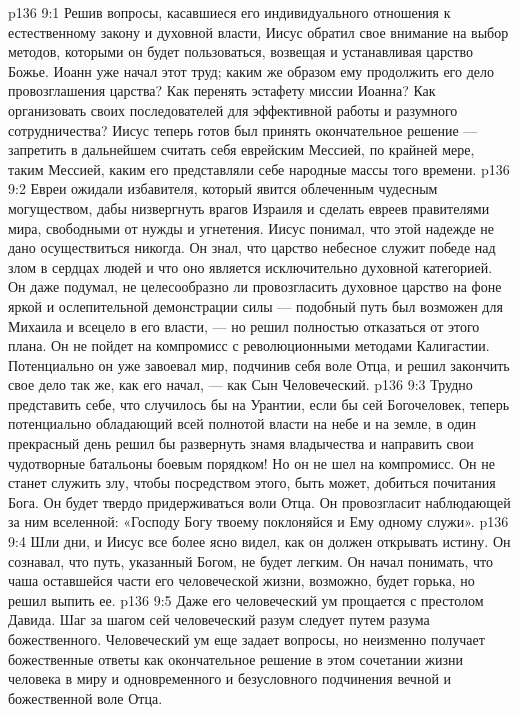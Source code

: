 \vs p136 9:1 Решив вопросы, касавшиеся его индивидуального отношения к естественному закону и духовной власти, Иисус обратил свое внимание на выбор методов, которыми он будет пользоваться, возвещая и устанавливая царство Божье. Иоанн уже начал этот труд; каким же образом ему продолжить его дело провозглашения царства? Как перенять эстафету миссии Иоанна? Как организовать своих последователей для эффективной работы и разумного сотрудничества? Иисус теперь готов был принять окончательное решение --- запретить в дальнейшем считать себя еврейским Мессией, по крайней мере, таким Мессией, каким его представляли себе народные массы того времени.
\vs p136 9:2 Евреи ожидали избавителя, который явится облеченным чудесным могуществом, дабы низвергнуть врагов Израиля и сделать евреев правителями мира, свободными от нужды и угнетения. Иисус понимал, что этой надежде не дано осуществиться никогда. Он знал, что царство небесное служит победе над злом в сердцах людей и что оно является исключительно духовной категорией. Он даже подумал, не целесообразно ли провозгласить духовное царство на фоне яркой и ослепительной демонстрации силы --- подобный путь был возможен для Михаила и всецело в его власти, --- но решил полностью отказаться от этого плана. Он не пойдет на компромисс с революционными методами Калигастии. Потенциально он уже завоевал мир, подчинив себя воле Отца, и решил закончить свое дело так же, как его начал, --- как Сын Человеческий.
\vs p136 9:3 Трудно представить себе, что случилось бы на Урантии, если бы сей Богочеловек, теперь потенциально обладающий всей полнотой власти на небе и на земле, в один прекрасный день решил бы развернуть знамя владычества и направить свои чудотворные батальоны боевым порядком! Но он не шел на компромисс. Он не станет служить злу, чтобы посредством этого, быть может, добиться почитания Бога. Он будет твердо придерживаться воли Отца. Он провозгласит наблюдающей за ним вселенной: «Господу Богу твоему поклоняйся и Ему одному служи».
\vs p136 9:4 Шли дни, и Иисус все более ясно видел, как он должен открывать истину. Он сознавал, что путь, указанный Богом, не будет легким. Он начал понимать, что чаша оставшейся части его человеческой жизни, возможно, будет горька, но решил выпить ее.
\vs p136 9:5 Даже его человеческий ум прощается с престолом Давида. Шаг за шагом сей человеческий разум следует путем разума божественного. Человеческий ум еще задает вопросы, но неизменно получает божественные ответы как окончательное решение в этом сочетании жизни человека в миру и одновременного и безусловного подчинения вечной и божественной воле Отца.
